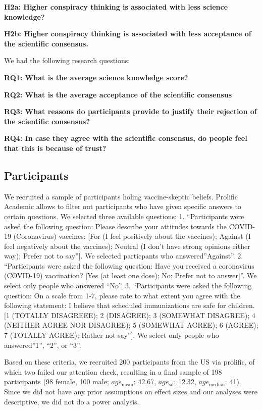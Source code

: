 \documentclass[
  doc,floatsintext]{apa6}
\begin{document}
\textbf{H2a: Higher conspiracy thinking is associated with less science knowledge?}

\textbf{H2b: Higher conspiracy thinking is associated with less acceptance of the scientific consensus.}

We had the following research questions:

\textbf{RQ1: What is the average science knowledge score?}

\textbf{RQ2: What is the average acceptance of the scientific consensus}

\textbf{RQ3: What reasons do participants provide to justify their rejection of the scientific consensus?}

\textbf{RQ4: In case they agree with the scientific consensus, do people feel that this is because of trust?}

\subsection{Participants}\label{participants-4}

We recruited a sample of participants holing vaccine-skeptic beliefs. Prolific Academic allows to filter out participants who have given specific answers to certain questions. We selected three available questions: 1. ``Participants were asked the following question: Please describe your attitudes towards the COVID-19 (Coronavirus) vaccines: {[}For (I feel positively about the vaccines); Against (I feel negatively about the vaccines); Neutral (I don't have strong opinions either way); Prefer not to say''{]}. We selected particpants who answered''Against''. 2. ``Participants were asked the following question: Have you received a coronavirus (COVID-19) vaccination? {[}Yes (at least one dose); No; Prefer not to answer{]}''. We select only people who answered ``No''. 3. ``Participants were asked the following question: On a scale from 1-7, please rate to what extent you agree with the following statement: I believe that scheduled immunizations are safe for children. {[}1 (TOTALLY DISAGREEE); 2 (DISAGREE); 3 (SOMEWHAT DISAGREE); 4 (NEITHER AGREE NOR DISAGREE); 5 (SOMEWHAT AGREE); 6 (AGREE); 7 (TOTALLY AGREE); Rather not say''{]}. We select only people who answered''1'', ``2'', or ``3''.

Based on these criteria, we recruited 200 participants from the US via prolific, of which two failed our attention check, resulting in a final sample of 198 participants (98 female, 100 male; \(age_\text{mean}\): 42.67, \(age_\text{sd}\): 12.32, \(age_\text{median}\): 41). Since we did not have any prior assumptions on effect sizes and our analyses were descriptive, we did not do a power analysis.
\end{document}

